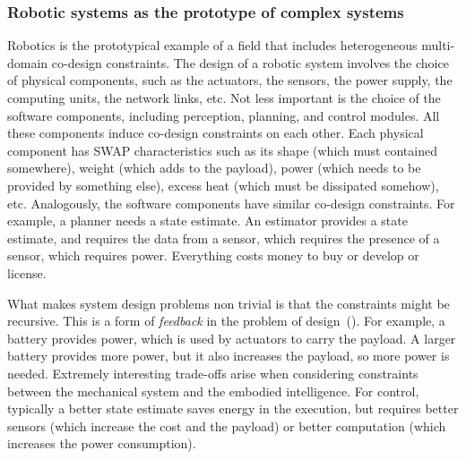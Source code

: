 \documentclass[twocolumn,english]{IEEEtran}
\theoremstyle{definition}
\theoremstyle{plain}
\theoremstyle{definition}
\theoremstyle{remark}
\theoremstyle{definition}
\theoremstyle{plain}
\theoremstyle{plain}
\begin{document}
\subsubsection*{Robotic systems as the prototype of complex systems}

Robotics is the prototypical example of a field that includes heterogeneous
multi-domain co-design constraints. The design of a robotic system
involves the choice of physical components, such as the actuators,
the sensors, the power supply, the computing units, the network links,
etc. Not less important is the choice of the software components,
including perception, planning, and control modules. All these components
induce co-design constraints on each other. Each physical component
has SWAP characteristics such as its shape (which must contained somewhere),
weight (which adds to the payload), power (which needs to be provided
by something else), excess heat (which must be dissipated somehow),
etc. Analogously, the software components have similar co-design constraints.
For example, a planner needs a state estimate. An estimator provides
a state estimate, and requires the data from a sensor, which requires
the presence of a sensor, which requires power. Everything costs money
to buy or develop or license. 

What makes system design problems non trivial is that the constraints
might be recursive. This is a form of \emph{feedback} in the problem
of design~(). For example, a battery provides power,
which is used by actuators to carry the payload. A larger battery
provides more power, but it also increases the payload, so more power
is needed. Extremely interesting trade-offs arise when considering
constraints between the mechanical system and the embodied intelligence.
For control, typically a better state estimate saves energy in the
execution, but requires better sensors (which increase the cost and
the payload) or better computation (which increases the power consumption). 
\end{document}
